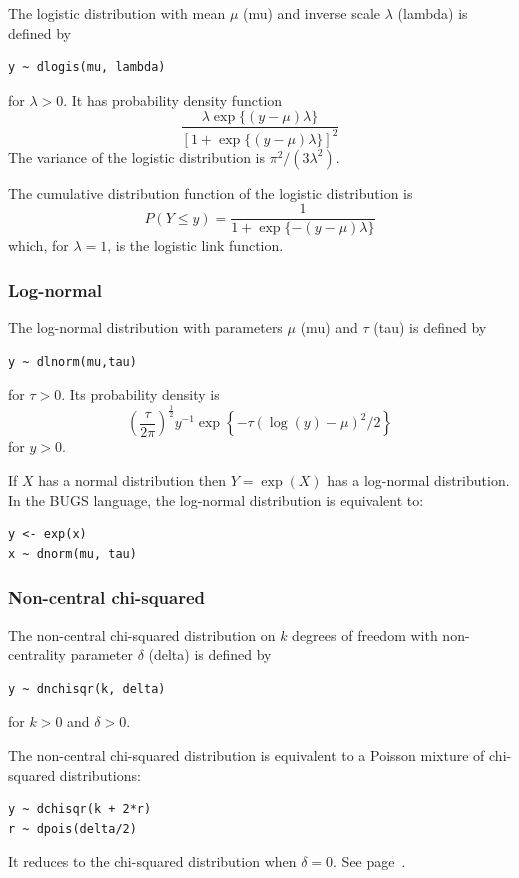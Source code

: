 \documentclass[11pt, a4paper, titlepage]{report}
\begin{document}
{The logistic distribution with mean $\mu$ (mu) and inverse scale
$\lambda$ (lambda) is defined by
\begin{verbatim}
y ~ dlogis(mu, lambda)
\end{verbatim}
for $\lambda > 0$. It has probability density function
\[
\frac{\textstyle \lambda \exp\{(y - \mu) \lambda \}}
     {\textstyle  \left[1 + \exp\{(y - \mu) \lambda \}\right]^2}
\]   
The variance of the logistic distribution is $\pi^2/(3\lambda^2)$.

The cumulative distribution function of the logistic distribution is
\[
P(Y \leq y) = \frac{1}{\textstyle  1 + \exp\{ - (y - \mu) \lambda \}}
\]
which, for $\lambda = 1$, is the logistic link function.

\subsubsection{Log-normal}
\label{bugs:dlnorm}

The log-normal distribution with parameters $\mu$ (mu) and $\tau$ (tau) is
defined by
\begin{verbatim}
y ~ dlnorm(mu,tau)
\end{verbatim}
for $\tau > 0$. Its probability density is
\[
\left(
\frac{\tau}{2\pi}
\right)^{\frac{1}{2}} y^{-1} \exp \left\{-\tau (\log(y) - \mu)^2 / 2 \right\}
\]
for $y > 0$.

If $X$ has a normal distribution then $Y = \exp(X)$ has a log-normal
distribution. In the BUGS language, the log-normal distribution is
equivalent to:
\begin{verbatim}
y <- exp(x)
x ~ dnorm(mu, tau)
\end{verbatim}

\subsubsection{Non-central chi-squared}
\label{bugs:dnchisqr}

The non-central chi-squared distribution on $k$ degrees of freedom with
non-centrality parameter $\delta$ (delta) is defined by
\begin{verbatim}
y ~ dnchisqr(k, delta)
\end{verbatim}
for $k > 0$ and $\delta > 0$.

The non-central chi-squared distribution is equivalent to a Poisson
mixture of chi-squared distributions:
\begin{verbatim}
y ~ dchisqr(k + 2*r)
r ~ dpois(delta/2)
\end{verbatim}
It reduces to the chi-squared distribution when $\delta = 0$. See
page~\pageref{bugs:dchisqr}.

}
\end{document}
